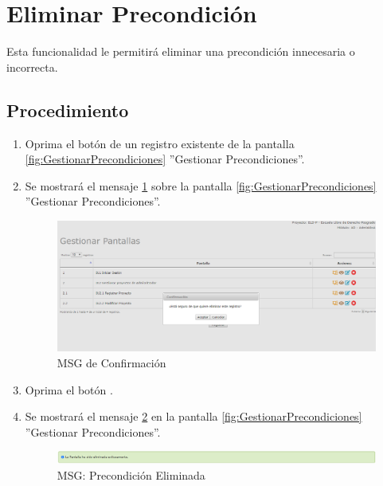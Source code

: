 \hypertarget{cv:eliminarPrecondicion}{\section{Eliminar Precondición}} \label{sec:eliminarPrecondicion}

	Esta funcionalidad le permitirá eliminar una precondición innecesaria o incorrecta. 

		\subsection{Procedimiento}

			\begin{enumerate}
	
			\item Oprima el botón \IUBotonEliminar{} de un registro existente de la pantalla \ref{fig:GestionarPrecondiciones} ''Gestionar Precondiciones''.
	
			\item Se mostrará el mensaje \ref{fig:confirmaEliminaPre} sobre la pantalla \ref{fig:GestionarPrecondiciones} ''Gestionar Precondiciones''.
			
			\begin{figure}[htbp!]
				\begin{center}
					\includegraphics[scale=0.5]{roles/lider/casosUso/pantallas/IU11-3MSG10}
					\caption{MSG de Confirmación}
					\label{fig:confirmaEliminaPre}
				\end{center}
			\end{figure}
						
			\item Oprima el botón \IUAceptar.
			
			\item Se mostrará el mensaje \ref{fig:PreEliminada} en la pantalla \ref{fig:GestionarPrecondiciones} ''Gestionar Precondiciones''.
			
			\begin{figure}[htbp!]
				\begin{center}
					\includegraphics[scale=0.5]{roles/lider/pantallas/pantallas/IU11-3MSG1}
					\caption{MSG: Precondición Eliminada}
					\label{fig:PreEliminada}
				\end{center}
			\end{figure}
			\end{enumerate}